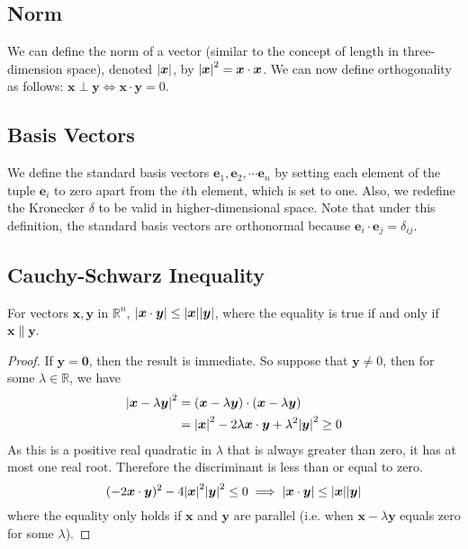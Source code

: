 \documentclass{article}
\begin{document}
	\subsection{Norm}
	We can define the norm of a vector (similar to the concept of length in three-dimension space), denoted $\abs {\bm x}$, by $\abs{\bm x}^2 = \bm x \cdot \bm x$. We can now define orthogonality as follows: $\bm x \perp \bm y \iff \bm x \cdot \bm y = 0$.
	
	\subsection{Basis Vectors}
	We define the standard basis vectors $\bm e_1, \bm e_2, \cdots \bm e_n$ by setting each element of the tuple $\bm e_i$ to zero apart from the $i$th element, which is set to one. Also, we redefine the Kronecker $\delta$ to be valid in higher-dimensional space. Note that under this definition, the standard basis vectors are orthonormal because $\bm e_i \cdot \bm e_j = \delta_{ij}$.
	
	\subsection{Cauchy-Schwarz Inequality}
	\begin{proposition}
		For vectors $\bm x, \bm y$ in $\mathbb R^n$, $\abs{\bm x \cdot \bm y} \leq \abs{\bm x} \abs{\bm y}$, where the equality is true if and only if $\bm x \parallel \bm y$.
	\end{proposition}
	\begin{proof}
		If $\bm y = \bm 0$, then the result is immediate. So suppose that $\bm y \neq 0$, then for some $\lambda \in \mathbb R$, we have
		\begin{align*}
			\abs{\bm x - \lambda \bm y}^2 &=
			(\bm x - \lambda \bm y) \cdot (\bm x - \lambda \bm y) \\
			&= \abs{\bm x}^2 - 2 \lambda \bm x \cdot \bm y + \lambda^2 \abs{\bm y}^2 \geq 0
		\end{align*}
		As this is a positive real quadratic in $\lambda$ that is always greater than zero, it has at most one real root. Therefore the discriminant is less than or equal to zero.
		\[ (-2 \bm x \cdot \bm y)^2 - 4 \abs{\bm x}^2\abs{\bm y}^2 \leq 0
		\implies \abs{\bm x \cdot \bm y} \leq \abs{\bm x}\abs{\bm y} \]
		where the equality only holds if $\bm x$ and $\bm y$ are parallel (i.e. when $\bm x - \lambda \bm y$ equals zero for some $\lambda$).
	\end{proof}
\end{document}
